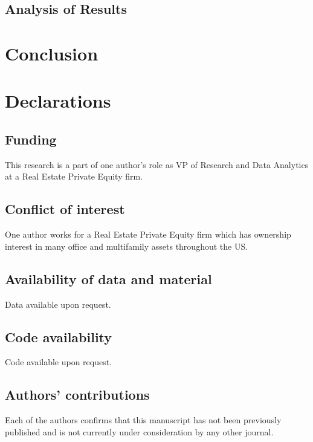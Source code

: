 \subsection{Analysis of Results}


\section{Conclusion}

\pagebreak


%
\section*{Declarations}
\subsection{Funding}
This research is a part of one author's role as VP of Research and Data Analytics at a Real Estate Private Equity firm. 

\subsection{Conflict of interest}
One author works for a Real Estate Private Equity firm which has ownership interest in many office and multifamily assets throughout the US. 

\subsection{Availability of data and material}
Data available upon request.

\subsection{Code availability}
Code available upon request.

\subsection{Authors' contributions}
Each of the authors confirms that this manuscript has not been previously published and is not currently under consideration by any other journal.




